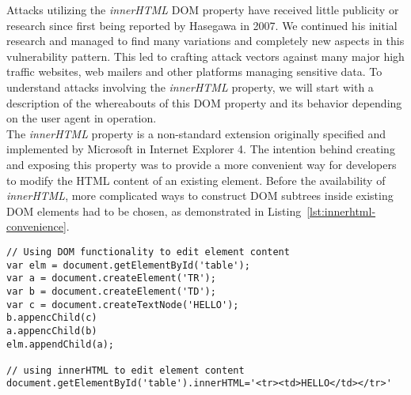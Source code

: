     Attacks utilizing the \textit{innerHTML} DOM property have received little publicity or research since first being reported by Hasegawa in 2007. We continued his initial research and managed to find many variations and completely new aspects in this vulnerability pattern. This led to crafting attack vectors against many major high traffic websites, web mailers and other platforms managing sensitive data. To understand attacks involving the \textit{innerHTML} property, we will start with a description of the whereabouts of this DOM property and its behavior depending on the user agent in operation.\\

    The \textit{innerHTML} property is a non-standard extension originally specified and implemented by Microsoft in Internet Explorer 4. The intention behind creating and exposing this property was to provide a more convenient way for developers to modify the HTML content of an existing element. Before the availability of \textit{innerHTML}, more complicated ways to construct DOM subtrees inside existing DOM elements had to be chosen, as demonstrated in Listing~\ref{lst:innerhtml-convenience}. 

\begin{lstlisting}[label=lst:innerhtml-convenience,caption=Sample code demonstrating the convenience benefit of innerHTML usage over standard DOM functionality application,captionpos=b]
// Using DOM functionality to edit element content
var elm = document.getElementById('table');
var a = document.createElement('TR');
var b = document.createElement('TD');
var c = document.createTextNode('HELLO');
b.appencChild(c)
a.appencChild(b)
elm.appendChild(a);

// using innerHTML to edit element content
document.getElementById('table').innerHTML='<tr><td>HELLO</td></tr>'
\end{lstlisting}


